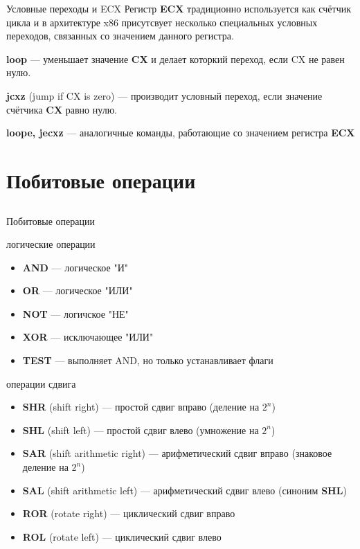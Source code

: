 \documentclass[utf8, russian]{beamer}
\begin{document}
    \begin{frame}{Условные переходы и ECX}
        Регистр {\bf ECX} традиционно используется как счётчик цикла и в архитектуре x86 присутсвует несколько специальных условных переходов, связанных со значением данного регистра.

        \bigskip
        {\bf loop} --- уменьшает значение {\bf CX} и делает которкий переход, если CX не равен нулю.

        \bigskip
        {\bf jcxz} (jump if CX is zero) --- производит условный переход, если значение счётчика {\bf CX} равно нулю.

        \bigskip
        {\bf loope, jecxz} --- аналогичные команды, работающие со значением регистра {\bf ECX}
    \end{frame}
    \section{Побитовые операции}
    \subsection{}
    \begin{frame}{Побитовые операции}\footnotesize
        \begin{block}{логические операции}
            \begin{itemize}
                \item {\bf AND} --- логическое "И"
                \item {\bf OR} --- логическое "ИЛИ"
                \item {\bf NOT} --- логичское "НЕ"
                \item {\bf XOR} --- исключающее "ИЛИ"
                \item {\bf TEST} --- выполняет AND, но только устанавливает флаги
            \end{itemize}
        \end{block}
        \begin{block}{операции сдвига}
            \begin{itemize}
                \item {\bf SHR} (shift right) --- простой сдвиг вправо (деление на $2^n$)
                \item {\bf SHL} (shift left) --- простой сдвиг влево (умножение на $2^n$)
                \item {\bf SAR} (shift arithmetic right) --- арифметический сдвиг вправо (знаковое деление на $2^n$)
                \item {\bf SAL} (shift arithmetic left) --- арифметический сдвиг влево (синоним {\bf SHL})
                \item {\bf ROR} (rotate right) --- циклический сдвиг вправо
                \item {\bf ROL} (rotate left) --- циклический сдвиг влево
            \end{itemize}
        \end{block}
    \end{frame}
\end{document}
